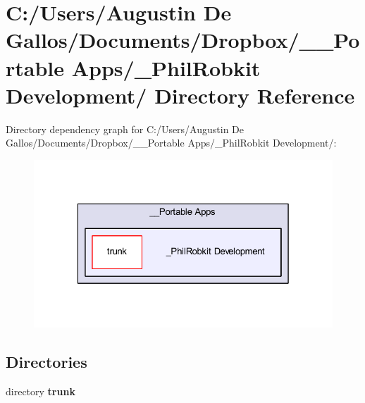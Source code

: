 \section{C\-:/\-Users/\-Augustin De Gallos/\-Documents/\-Dropbox/\-\_\-\-\_\-\-Portable Apps/\-\_\-\-Phil\-Robkit Development/ Directory Reference}
\label{dir_28c006178a5612d60e6b550b67fe6e43}
Directory dependency graph for C\-:/\-Users/\-Augustin De Gallos/\-Documents/\-Dropbox/\-\_\-\-\_\-\-Portable Apps/\-\_\-\-Phil\-Robkit Development/\-:\nopagebreak
\begin{figure}[H]
\begin{center}
\leavevmode
\includegraphics[width=326pt]{dir_28c006178a5612d60e6b550b67fe6e43_dep}
\end{center}
\end{figure}
\subsection*{Directories}
\begin{DoxyCompactItemize}
\item 
directory {\bf trunk}
\end{DoxyCompactItemize}
